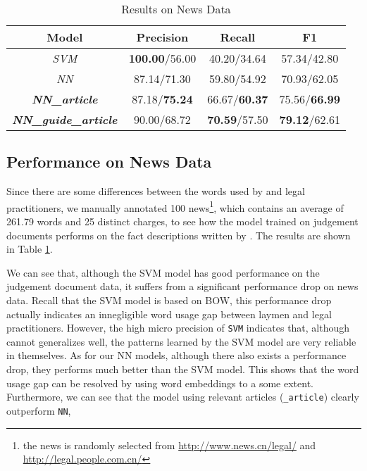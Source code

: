\begin{table}
\centering
\small{
\begin{tabular}{|c|c|c|c|}
\hline
\textbf{Model}												& \textbf{Precision} 				& \textbf{Recall} 				& \textbf{F1} 	\\
\hline
\textit{SVM} 													& \textbf{100.00}/56.00			& 40.20/34.64  						& 57.34/42.80 				 	\\
\hline
\textit{NN}														& 87.14/71.30								& 59.80/54.92 						& 70.93/62.05					\\
\hline
\textbf{\textit{NN\_article}}					& 87.18/\textbf{75.24}			& 66.67/\textbf{60.37} 		& 75.56/\textbf{66.99}					\\
\hline
\textbf{\textit{NN\_guide\_article}} 	& 90.00/68.72 							& \textbf{70.59}/57.50 		& \textbf{79.12}/62.61 		 	\\
\hline
\end{tabular}
}
\caption{Results on News Data}
\label{tabble_news_results}
\end{table}

\subsection{Performance on News Data}
Since there are some differences between the words used by  and legal practitioners, 
we manually annotated 100 news\footnote{the news is randomly selected from \url{http://www.news.cn/legal/} and \url{http://legal.people.com.cn/}}, 
which contains an average of 261.79 words and 25 distinct charges, to see how the model trained on judgement documents performs on the fact descriptions written by . The results are shown in Table \ref{tabble_news_results}.

We can see that, although the SVM model has good performance on the judgement document data, it suffers from a significant performance drop on news data.
Recall that the SVM model is based on BOW, this performance drop actually indicates an innegligible word usage gap between laymen and legal practitioners. 
However, the high micro precision of \texttt{SVM} indicates that, although cannot generalizes well, the patterns learned by the SVM model are very reliable in themselves.
As for our NN models, although there also exists a performance drop, they performs much better than the SVM model. This shows that the word usage gap can be resolved by using word embeddings to a some extent. Furthermore, we can see that the model using relevant articles (\texttt{\_article}) clearly outperform \texttt{NN}, 

